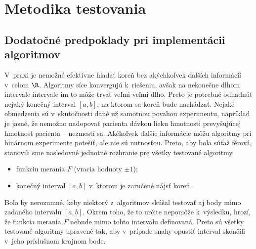 \section{Metodika testovania}
\subsection{Dodatočné predpoklady pri implementácii algoritmov}

V~praxi je nemožné efektívne hľadať koreň bez akýchkoľvek ďalších informácií
v~celom $\R$. Algoritmy síce konvergujú k~riešeniu, avšak na nekonečne dlhom
intervale intervale im to môže trvať veľmi veľmi dlho. Preto je potrebné
odhadnúť nejaký konečný interval $[a, b]$, na ktorom sa koreň bude nachádzať.
Nejaké obmedzenia sú v~skutočnosti dané už samotnou povahou experimentu,
napríklad je jasné, že nemožno nadopovať pacienta dávkou lieku hmotnosti
prevyšujúcej hmotnosť pacienta -- nezmestí sa. Akékoľvek ďalšie informácie môžu
algoritmy pri binárnom experimente potešiť, ale nie sú nutnosťou. Preto, aby
bola súťaž férová, stanovili sme nasledovné jednotné rozhranie pre všetky
testované algoritmy

\begin{itemize}
\item funkciu merania $F$ (vracia hodnoty $\pm1$);
\item konečný interval $[a,b]$ v~ktorom je zaručené nájsť koreň.
\end{itemize}

Bolo by nerozumné, keby niektorý z~algoritmov skúšal testovať aj body mimo
zadaného intervalu $[a,b]$. Okrem toho, že to určite nepomôže k~výsledku, hrozí,
že funkcia merania $F$ nebude mimo tohto intervalu definovaná. Preto sú všetky
testované algoritmy upravené tak, aby v~prípade snahy opustiť interval skončili
v~jeho príslušnom krajnom bode.

